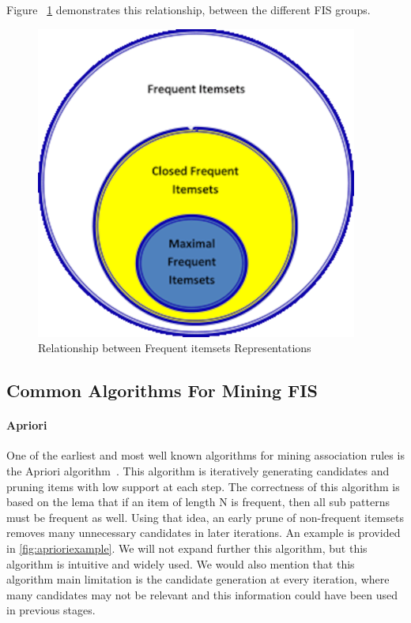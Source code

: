 Figure ~\ref{fig:relationBetweenFIS} demonstrates this relationship,  between the different FIS groups.
\begin{figure}[H]
  \centering
  \includegraphics[width=\linewidth]{figures/relationBetweenFIS}
  \caption{Relationship between Frequent itemsets Representations}
  \label{fig:relationBetweenFIS}
\end{figure}

\subsection{Common Algorithms For Mining FIS}
\paragraph{Apriori}
One of the earliest and most well known algorithms for mining association rules is the Apriori algorithm~\cite{agrawal1994fast}. This algorithm is iteratively generating candidates and pruning items with low support at each step. The correctness of this algorithm is based on the lema that if an item of length N is frequent, then all sub patterns must be frequent as well. Using that idea, an early prune of non-frequent itemsets removes many unnecessary candidates in later iterations. An example is provided in \autoref{fig:aprioriexample}. We will not expand further this algorithm, but this algorithm is intuitive and widely used. We would also mention that this algorithm main limitation is the candidate generation at every iteration, where many candidates may not be relevant and this information could have been used in previous stages.
  
